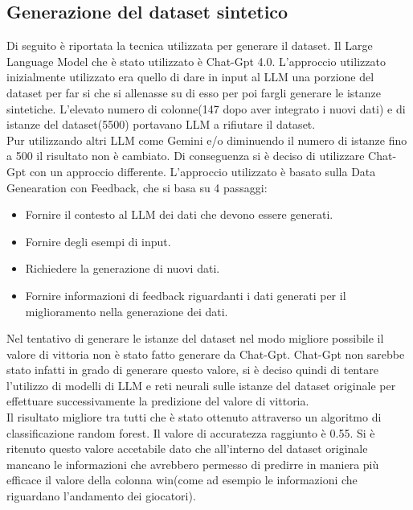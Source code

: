 \subsection{Generazione del dataset sintetico}
Di seguito è riportata la tecnica utilizzata per generare il dataset.
Il Large Language Model che è stato utilizzato è Chat-Gpt 4.0. L'approccio utilizzato inizialmente utilizzato era quello di dare in input al LLM una porzione del dataset per far si che si allenasse su di esso per poi fargli generare le istanze sintetiche. L'elevato numero di colonne(147 dopo aver integrato i nuovi dati) e di istanze del dataset(5500) portavano LLM a rifiutare il dataset. \\
Pur utilizzando altri LLM come Gemini e/o diminuendo il numero di istanze fino a 500 il risultato non è cambiato. Di conseguenza si è deciso di utilizzare Chat-Gpt con un approccio differente. L'approccio utilizzato è basato sulla Data Genearation con Feedback, che si basa su 4 passaggi:
\begin{itemize}
\item Fornire il contesto al LLM dei dati che devono essere generati.
\item Fornire degli esempi di input.
\item Richiedere la generazione di nuovi dati.
\item Fornire informazioni di feedback riguardanti i dati generati per il miglioramento nella generazione dei dati.
\end{itemize}  
Nel tentativo di generare le istanze del dataset nel modo migliore possibile il valore di vittoria non è stato fatto generare da Chat-Gpt. Chat-Gpt non sarebbe stato infatti in grado di generare questo valore, si è deciso quindi di tentare l'utilizzo di modelli di LLM e reti neurali sulle istanze del dataset originale per effettuare successivamente la predizione del valore di vittoria. \\
Il risultato migliore tra tutti che è stato ottenuto attraverso un algoritmo di classificazione random forest. Il valore di accuratezza raggiunto è 0.55. Si è ritenuto questo valore accetabile dato che all'interno del dataset originale mancano le informazioni che avrebbero permesso di predirre in maniera più efficace il valore della colonna win(come ad esempio le informazioni che riguardano l'andamento dei giocatori).





















 